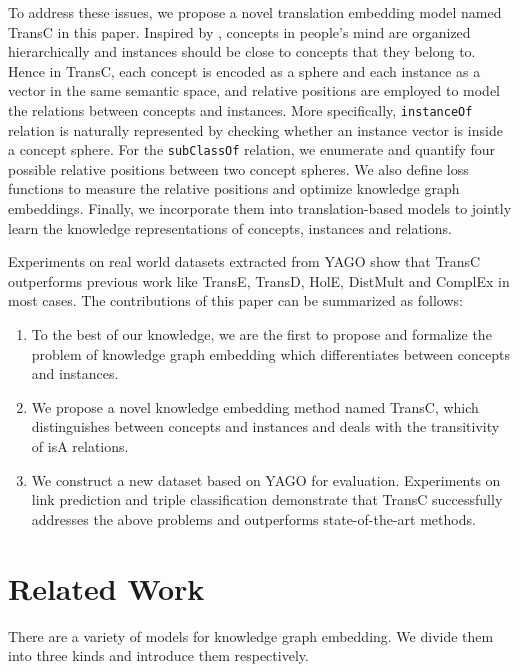 \documentclass[11pt,a4paper]{article}
\begin{document}
  To address these issues, we propose a novel translation embedding model named TransC in this paper. 
  Inspired by \cite{mind}, concepts in people's mind are organized hierarchically and instances should 
  be close to concepts that they belong to.
  Hence in TransC, each concept is encoded as a sphere and each instance as a vector in the same semantic space, and relative 
  positions are employed to model the relations between concepts and instances. More specifically, \texttt{instanceOf} 
  relation is naturally represented by checking whether an instance vector is inside a concept sphere. For the 
  \texttt{subClassOf} relation, we enumerate and quantify four possible relative positions between two concept spheres. 
  We also define loss functions to measure the relative positions and optimize knowledge graph embeddings.
  Finally, we incorporate them into  translation-based models to jointly learn the knowledge
  representations of concepts, instances and relations.
  
  Experiments on real world datasets extracted 
  from YAGO show that TransC outperforms previous work like TransE, TransD, HolE, DistMult and ComplEx in most cases. 
  The contributions of this paper 
  can be summarized as follows:
  
  \begin{enumerate}
    \item To the best of our knowledge, we are the first to propose and formalize the problem of 
    knowledge graph embedding which differentiates between concepts and instances.
    \item We propose a novel knowledge embedding method named TransC, which distinguishes between concepts and instances
    and deals with the transitivity of isA relations.
    \item We construct a new dataset based on YAGO for evaluation. 
    Experiments on link prediction and triple classification demonstrate that TransC successfully addresses the above problems and 
    outperforms state-of-the-art methods.
  
  \end{enumerate}  
  
  \section{Related Work}
  
  There are a variety of models for knowledge graph embedding. We divide them into three kinds and introduce them respectively.
  
\end{document}
